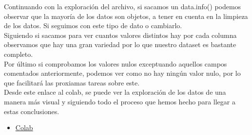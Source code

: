 \documentclass[12pt]{article}
\begin{document}
Continuando con la exploración del archivo, si sacamos un data.info() podemos observar que la mayoría de los datos son 
objetos, a tener en cuenta en la limpieza de los datos. Si seguimos con este tipo de dato o cambiarlo.
\\
Siguiendo si sacamos para ver cuantos valores distintos hay por cada columna observamos que hay una gran variedad por lo que
nuestro dataset es bastante completo.
\\
Por último si comprobamos los valores nulos exceptuando aquellos campos comentados anteriormente, podemos ver como no hay 
ningún valor nulo, por lo que facilitará las proxiamas tareas sobre este.
\\
Desde este enlace al colab, se puede ver la exploración de los datos de una manera más visual y siguiendo todo el proceso que
hemos hecho para llegar a estas conclusiones.

\begin{itemize}
    \item \href{https://colab.research.google.com/drive/1pA3PSNv5cui1JHyDh54nvRc1NihJn-0F?usp=sharing}{Colab}
\end{itemize}
\end{document}
